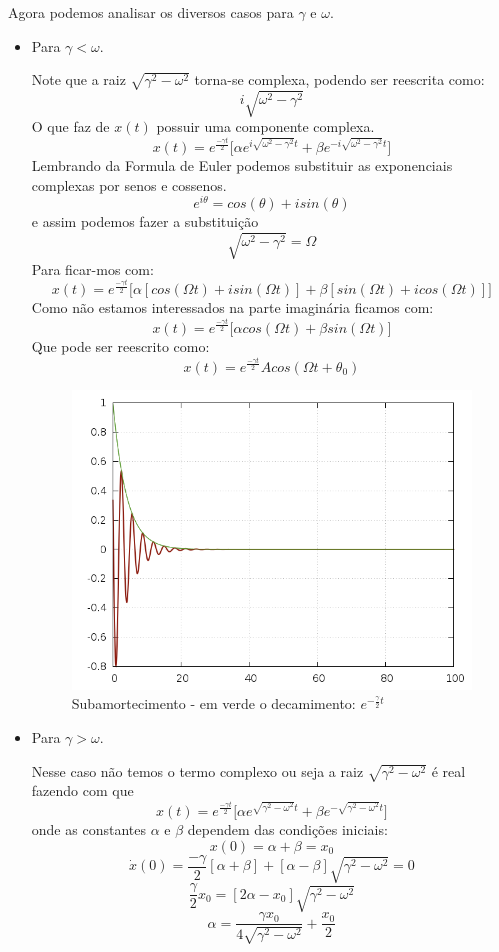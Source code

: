 \documentclass[a4paper,12pt]{article}
\begin{document}
	Agora podemos analisar os diversos casos para $\gamma$ e $\omega$.
	\begin{itemize}
	\item Para  $\gamma < \omega$.
	
		Note que a raiz $\sqrt{\gamma^2 - \omega^2}$ torna-se complexa, podendo ser reescrita como:
		\[ i\sqrt{\omega^2 - \gamma^2} \]
		O que faz de $x(t)$ possuir uma componente complexa.
		\[ x(t) = e^{\frac{ -\gamma t }{2}} \Big[\alpha e^{i\sqrt{\omega^2 - \gamma^2 }t} + \beta e^{-i\sqrt{\omega^2 - \gamma^2 }t} \Big] \]
		Lembrando da Formula de Euler podemos substituir as exponenciais complexas por senos e cossenos.
		\[ e^{i\theta} = cos(\theta) + isin(\theta)\]
		e assim podemos fazer a substituição
		\[ \sqrt{\omega^2 - \gamma^2 } = \Omega \]
		Para ficar-mos com:
		\[  x(t) = e^{\frac{ -\gamma t}{2}}\Big[ \alpha[ cos(\Omega t)+isin(\Omega t) ] + \beta[sin(\Omega t ) +icos(\Omega t)] \Big]\]
		Como não estamos interessados na parte imaginária ficamos com:
		\[  x(t) = e^{\frac{ -\gamma t}{2}}\Big[ \alpha cos(\Omega t)+\beta sin(\Omega t) \Big]\]
		Que pode ser reescrito como:
		\[  x(t) = e^{\frac{ -\gamma t}{2}} A cos(\Omega t + \theta_0)\]
	
	\begin{figure}[h]
		\centering
		\includegraphics[scale=0.6]{7o0.png}
		\caption{Subamortecimento - em verde o decamimento: $e^{-\frac{\gamma}{2}t}$}
	\end{figure}
	
	\item Para  $\gamma > \omega$.
	
		Nesse caso não temos o termo complexo ou seja a raiz $\sqrt{\gamma^2 - \omega^2}$ é real fazendo com que
		\[ x(t) =  e^{\frac{ -\gamma t}{2}} \Big[\alpha e^{\sqrt{\gamma^2 - \omega^2}t} + \beta e^{- \sqrt{\gamma^2 - \omega^2}t} \Big]\]
		onde as constantes $\alpha$ e $\beta$  dependem das condições iniciais:
		\[ x(0) = \alpha + \beta = x_0 \]
		\[ \dot{x}(0) = \frac{ -\gamma}{2} [ \alpha + \beta] + [\alpha - \beta ]\sqrt{\gamma^2 - \omega^2} = 0\]
		\[\frac{ \gamma}{2} x_0 = [2\alpha - x_0]\sqrt{\gamma^2 - \omega^2}\]
		\[\alpha = \frac{ \gamma x_0}{4 \sqrt{\gamma^2 - \omega^2}}  + \frac{x_0}{2}\]
			

\end{itemize}
\end{document}
